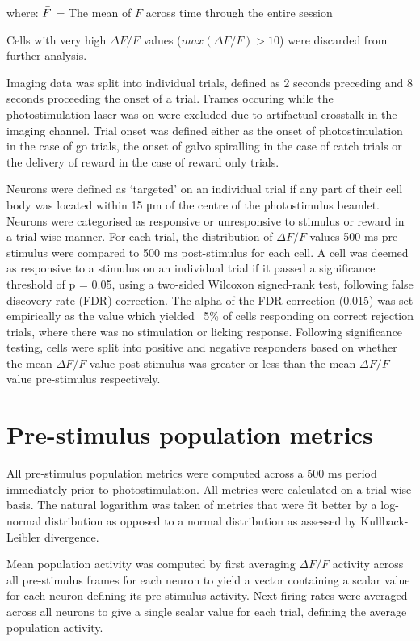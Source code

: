 where: \newline
$\Bar{F}$ = The mean of $F$ across time through the entire session

Cells with very high $\Delta F/F$ values ($max(\Delta F / F) > 10 $) were discarded from further analysis.

Imaging data was split into individual trials, defined as 2 seconds preceding and 8 seconds proceeding the onset of a trial. Frames occuring while the photostimulation laser was on were excluded due to artifactual crosstalk in the imaging channel. Trial onset was defined either as the onset of photostimulation in the case of go trials, the onset of galvo spiralling in the case of catch trials or the delivery of reward in the case of reward only trials. 

Neurons were defined as ‘targeted’ on an individual trial if any part of their cell body was located within 15 μm of the centre of the photostimulus beamlet. Neurons were categorised as responsive or unresponsive to stimulus or reward in a trial-wise manner. For each trial, the distribution of $\Delta F/F$ values 500 ms pre-stimulus were compared to 500 ms post-stimulus for each cell. A cell was deemed as responsive to a stimulus on an individual trial if it passed a significance threshold of p = 0.05, using a two-sided Wilcoxon signed-rank test, following false discovery rate (FDR) correction. The alpha of the FDR correction (0.015) was set empirically as the value which yielded ~5\% of cells responding on correct rejection trials, where there was no stimulation or licking response. Following significance testing, cells were split into positive and negative responders based on whether the mean $\Delta F/F$ value post-stimulus was greater or less than the mean $\Delta F/F$ value pre-stimulus respectively.

\section{Pre-stimulus population metrics}

All pre-stimulus population metrics were computed across a 500 ms period immediately prior to photostimulation. All metrics were calculated on a trial-wise basis. The natural logarithm was taken of metrics that were fit better by a log-normal distribution as opposed to a normal distribution as assessed by Kullback-Leibler divergence. 

Mean population activity was computed by first averaging $\Delta F/F$ activity across all pre-stimulus frames for each neuron to yield a vector containing a scalar value for each neuron defining its pre-stimulus activity. Next firing rates were averaged across all neurons to give a single scalar value for each trial, defining the average population activity. 

